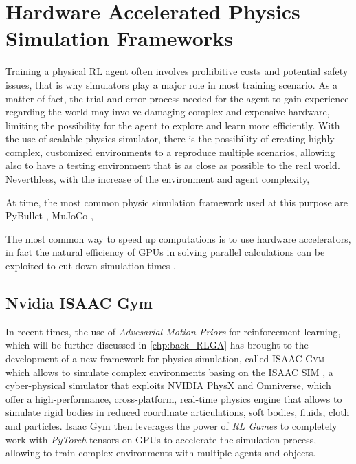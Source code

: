 \chapter{Hardware Accelerated Physics Simulation Frameworks}
\label{chp:back_PhysicsSimulators}

Training a physical \ac{RL} agent often involves prohibitive costs and potential safety issues, that is why simulators play a major role in most training scenario. As a matter of fact, the trial-and-error process needed for the agent to gain experience regarding the world may involve damaging complex and expensive hardware, limiting the possibility for the agent to explore and learn more efficiently. With the use of scalable physics simulator, there is the possibility of creating highly complex, customized environments to a reproduce multiple scenarios, allowing also to have a testing environment that is as close as possible to the real world. Neverthless, with the increase of the environment and agent complexity,

At time, the most common physic simulation framework used at this purpose are PyBullet \citep{coumans_pybullet_2016}, MuJoCo \citep{todorov_mujoco_2012},

The most common way to speed up computations is to use hardware accelerators, in fact the natural efficiency of \ac{GPU}s in solving parallel calculations can be exploited to cut down simulation times \cite{liang_gpu-accelerated_2018}.

\section{Nvidia ISAAC Gym}

In recent times, the use of \textit{Advesarial Motion Priors} \citep{peng_amp_2021} for reinforcement learning, which will be further discussed in \cref{chp:back_RLGA} has brought to the development of a new framework for physics simulation, called \textsc{ISAAC Gym} \citep{makoviychuk_isaac_2021} which allows to simulate complex environments basing on the \textsc{ISAAC SIM} \citep{zhou_towards_2023}, a cyber-physical simulator that exploits NVIDIA PhysX and Omniverse, which offer a high-performance, cross-platform, real-time physics engine that allows to simulate rigid bodies in reduced coordinate articulations, soft bodies, fluids, cloth and particles. Isaac Gym then leverages the power of \textit{RL Games} \citep{rl-games2021} to completely work with \textit{PyTorch} \citep{paszke_pytorch_2019} tensors on \ac{GPU}s to accelerate the simulation process, allowing to train complex environments with multiple agents and objects.

